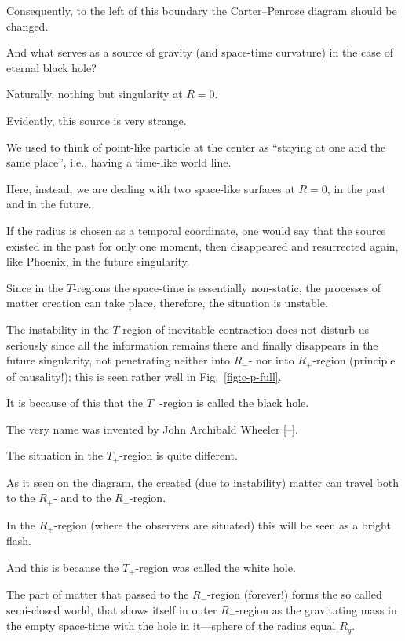 Consequently, to the left of this boundary the Carter--Penrose diagram should be changed. 

And what serves as a source of gravity (and space-time curvature) in the case of eternal black hole?

Naturally, nothing but  singularity at $R=0$. 

Evidently, this source is very strange. 

We used to think of point-like particle at the center as ``staying at one and the same place'', i.e., having a time-like world line. 

Here, instead, we are dealing with two space-like surfaces at $R=0$, in the past and in the future. 

If the radius is chosen as a temporal coordinate, one would say that the source existed in the past for only one moment, then disappeared and resurrected again, like Phoenix, in the future singularity. 

Since in the $T$-regions the space-time is essentially non-static, the processes of matter creation can take place, therefore, the situation is unstable. 

The instability in the $T$-region of inevitable contraction does not disturb us seriously since all the information remains there and finally disappears in the future singularity, not penetrating neither into $R_-$- nor into $R_+$-region (principle of causality!); this is seen rather well in Fig.~\ref{fig:c-p-full}. 

It is because of this that the $T_-$-region is called the black hole. 

The very name was invented by John Archibald Wheeler [--]. 

The situation in the $T_+$-region is quite different. 

As it seen on the diagram, the created (due to instability) matter can travel both to the $R_+$- and to the $R_-$-region. 

In the $R_+$-region (where the observers are situated) this will be seen as a bright flash. 

And this is because the $T_+$-region was called the white hole. 

The part of matter that passed to the $R_-$-region (forever!) forms the so called semi-closed world, that shows itself in outer $R_+$-region as the gravitating mass in the empty space-time with the hole in it---sphere of the radius equal    $R_g$.



